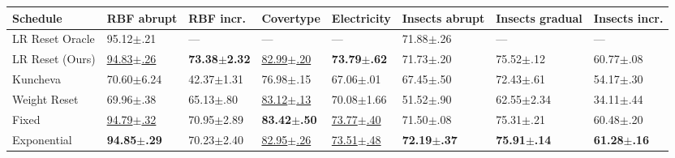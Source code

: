 \begin{tabular}{llllllll}
    \toprule
    Schedule        & RBF abrupt                & RBF incr.                & Covertype                 & Electricity               & Insects abrupt          & Insects gradual         & Insects incr.           \\
    \midrule
    LR Reset Oracle & 95.12$\pm$.21             & ---                      & ---                       & ---                       & 71.88$\pm$.26           & ---                     & ---                     \\
    LR Reset (Ours) & \underline{94.83$\pm$.26} & \bfseries 73.38$\pm$2.32 & \underline{82.99$\pm$.20} & \bfseries 73.79$\pm$.62   & 71.73$\pm$.20           & 75.52$\pm$.12           & 60.77$\pm$.08           \\
    Kuncheva        & 70.60$\pm$6.24            & 42.37$\pm$1.31           & 76.98$\pm$.15             & 67.06$\pm$.01             & 67.45$\pm$.50           & 72.43$\pm$.61           & 54.17$\pm$.30           \\
    Weight Reset    & 69.96$\pm$.38             & 65.13$\pm$.80            & \underline{83.12$\pm$.13} & 70.08$\pm$1.66            & 51.52$\pm$.90           & 62.55$\pm$2.34          & 34.11$\pm$.44           \\
    Fixed           & \underline{94.79$\pm$.32} & 70.95$\pm$2.89           & \bfseries 83.42$\pm$.50   & \underline{73.77$\pm$.40} & 71.50$\pm$.08           & 75.31$\pm$.21           & 60.48$\pm$.20           \\
    Exponential     & \bfseries 94.85$\pm$.29   & 70.23$\pm$2.40           & \underline{82.95$\pm$.26} & \underline{73.51$\pm$.48} & \bfseries 72.19$\pm$.37 & \bfseries 75.91$\pm$.14 & \bfseries 61.28$\pm$.16 \\
    \bottomrule
\end{tabular}
